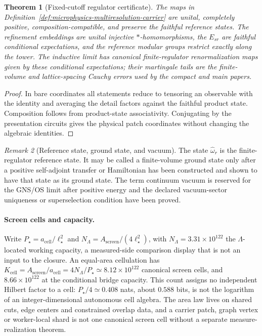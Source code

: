 \documentclass[11pt]{article}
\newtheorem{theorem}{Theorem}[section]
\theoremstyle{remark}
\newtheorem{remark}[theorem]{Remark}
\theoremstyle{plain}
\begin{document}
\begin{theorem}[Fixed-cutoff regulator certificate]\label{thm:microphysics-regulator-certificate}
The maps in Definition~\ref{def:microphysics-multiresolution-carrier} are unital, completely
positive, composition-compatible, and preserve the faithful reference states. The refinement
embeddings are unital injective \(*\)-homomorphisms, the \(E_{sr}\) are faithful conditional
expectations, and the reference modular groups restrict exactly along the tower. The inductive
limit has canonical finite-regulator renormalization maps given by these conditional
expectations; their martingale tails are the finite-volume and lattice-spacing Cauchy errors used
by the compact and main papers.
\end{theorem}

\begin{proof}
In bare coordinates all statements reduce to tensoring an observable with the identity and
averaging the detail factors against the faithful product state. Composition follows from
product-state associativity. Conjugating by the presentation circuits gives the physical patch
coordinates without changing the algebraic identities.
\end{proof}

\begin{remark}[Reference state, ground state, and vacuum]
The state \(\widehat\omega_r\) is the finite-regulator reference state. It may be called a
finite-volume ground state only after a positive self-adjoint transfer or Hamiltonian has been
constructed and shown to have that state as its ground state. The term continuum vacuum is reserved
for the GNS/OS limit after positive energy and the declared vacuum-sector uniqueness or
superselection condition have been proved.
\end{remark}

\paragraph{Screen cells and capacity.}
Write \(P_\star=a_{\mathrm{cell}}/\ell_\star^2\) and
\(N_\Lambda=A_{\mathrm{screen}}/(4\ell_\star^2)\), with
\(N_\Lambda=3.31\times10^{122}\) the \(\Lambda\)-located working capacity, a
measured-side comparison display that is not an input to the closure. An
equal-area cellulation has
\(K_{\mathrm{cell}}=A_{\mathrm{screen}}/a_{\mathrm{cell}}=4N_\Lambda/P_\star
\simeq8.12\times10^{122}\) canonical screen cells, and \(8.66\times10^{122}\)
at the conditional bridge capacity. This count assigns no independent Hilbert
factor to a cell: \(P_\star/4\simeq0.408\) nats, about \(0.588\) bits, is not
the logarithm of an integer-dimensional autonomous cell algebra. The area law
lives on shared cuts, edge centers and constrained overlap data, and a
carrier patch, graph vertex or worker-local shard is not one canonical screen
cell without a separate measure-realization theorem.
\end{document}
